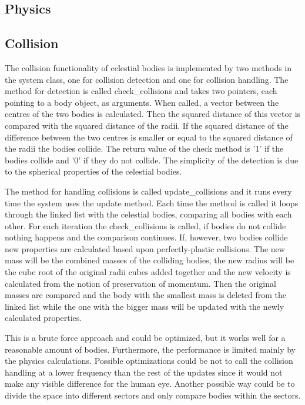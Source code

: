 \documentclass[a4paper,12pt]{article} \usepackage{graphicx}
\begin{document}
\subsection{Physics}
\subsection{Collision}
The collision functionality of celestial bodies is implemented by two methods in
the system class, one for collision detection and one for collision handling.
The method for detection is called check\_collisions and takes two pointers,
each pointing to a body object, as arguments. When called, a vector between the centres of the two
bodies is calculated. Then the squared distance of this vector is compared with
the squared distance of the radii. If the squared distance of the difference
between the two centres is smaller or equal to the squared distance of the radii
the bodies collide. The return value of the check method is '1' if the bodies
collide and '0' if they do not collide. The simplicity of the detection is due
to the spherical properties of the celestial bodies.

The method for handling collisions is called update\_collisions and it runs
every time the system uses the update method. Each time the method is called it loops
through the linked list with the celestial bodies, comparing all bodies with
each other. For each iteration the check\_collisions is called, if bodies do not
collide nothing happens and the comparison continues. If, however, two bodies
collide new properties are calculated based upon perfectly-plastic collisions. 
The new mass will be the combined masses of the colliding bodies, the new radius
will be the cube root of the original radii cubes added together and the new
velocity is calculated from the notion of preservation of momentum. Then the
original masses are compared and the body with the smallest mass is deleted from
the linked list while the one with the bigger mass will be updated with the
newly calculated properties.

This is a brute force approach and could be optimized, but it works well for a
reasonable amount of bodies. Furthermore, the performance is limited mainly by the
physics calculations. Possible optimizations could be not to call the collision
handling at a lower frequency than the rest of the updates since it would not
make any visible difference for the human eye. Another possible way could be to
divide the space into different sectors and only compare bodies within the
sectors. 
\end{document}
